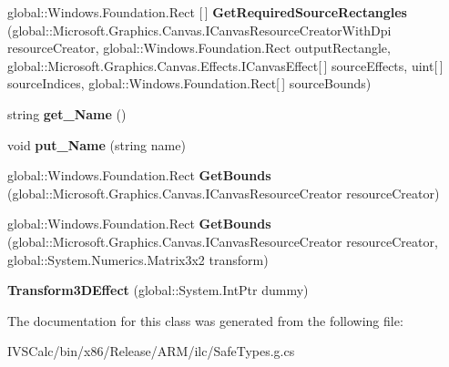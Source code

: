 \begin{DoxyCompactItemize}
\item 
\mbox{\label{class_microsoft_1_1_graphics_1_1_canvas_1_1_effects_1_1_transform3_d_effect_afd5ca67543d05c05c9a3eed192b49635}} 
global\+::\+Windows.\+Foundation.\+Rect \mbox{[}$\,$\mbox{]} {\bfseries Get\+Required\+Source\+Rectangles} (global\+::\+Microsoft.\+Graphics.\+Canvas.\+I\+Canvas\+Resource\+Creator\+With\+Dpi resource\+Creator, global\+::\+Windows.\+Foundation.\+Rect output\+Rectangle, global\+::\+Microsoft.\+Graphics.\+Canvas.\+Effects.\+I\+Canvas\+Effect\mbox{[}$\,$\mbox{]} source\+Effects, uint\mbox{[}$\,$\mbox{]} source\+Indices, global\+::\+Windows.\+Foundation.\+Rect\mbox{[}$\,$\mbox{]} source\+Bounds)
\item 
\mbox{\label{class_microsoft_1_1_graphics_1_1_canvas_1_1_effects_1_1_transform3_d_effect_abeb49b0cd72d2a8a1ee087855183220b}} 
string {\bfseries get\+\_\+\+Name} ()
\item 
\mbox{\label{class_microsoft_1_1_graphics_1_1_canvas_1_1_effects_1_1_transform3_d_effect_aee37d65325d885f638ac7db9a43f1363}} 
void {\bfseries put\+\_\+\+Name} (string name)
\item 
\mbox{\label{class_microsoft_1_1_graphics_1_1_canvas_1_1_effects_1_1_transform3_d_effect_ae3e5b20ce4cd94f594d9b50fc74ee771}} 
global\+::\+Windows.\+Foundation.\+Rect {\bfseries Get\+Bounds} (global\+::\+Microsoft.\+Graphics.\+Canvas.\+I\+Canvas\+Resource\+Creator resource\+Creator)
\item 
\mbox{\label{class_microsoft_1_1_graphics_1_1_canvas_1_1_effects_1_1_transform3_d_effect_a9e9d12b267f452ee3aa3b6b19363d355}} 
global\+::\+Windows.\+Foundation.\+Rect {\bfseries Get\+Bounds} (global\+::\+Microsoft.\+Graphics.\+Canvas.\+I\+Canvas\+Resource\+Creator resource\+Creator, global\+::\+System.\+Numerics.\+Matrix3x2 transform)
\item 
\mbox{\label{class_microsoft_1_1_graphics_1_1_canvas_1_1_effects_1_1_transform3_d_effect_af7099edb8f0d394bed7b6d387eb4c183}} 
{\bfseries Transform3\+D\+Effect} (global\+::\+System.\+Int\+Ptr dummy)
\end{DoxyCompactItemize}


The documentation for this class was generated from the following file\+:\begin{DoxyCompactItemize}
\item 
I\+V\+S\+Calc/bin/x86/\+Release/\+A\+R\+M/ilc/Safe\+Types.\+g.\+cs\end{DoxyCompactItemize}
